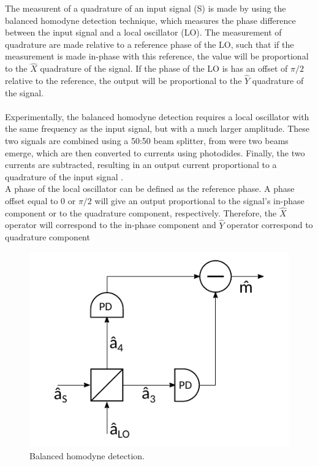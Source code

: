 The measurent of a quadrature of an input signal (S) is made by using the balanced homodyne detection technique, which measures the phase difference between the input signal and a local oscillator (LO). The measurement of quadrature are made relative to a reference phase of the LO, such that if the measurement is made in-phase with this reference, the value will be proportional to the $\hat{X}$ quadrature of the signal. If the phase of the LO is has an offset of $\pi/2$ relative to the reference, the output will be proportional to the $\hat{Y}$ quadrature of the signal.\\
\\
Experimentally, the balanced homodyne detection requires a local oscillator with the same frequency as the input signal, but with a much larger amplitude. These two signals are combined using a 50:50 beam splitter, from were two beams emerge, which are then converted to currents using photodides. Finally, the two currents are subtracted, resulting in an output current proportional to a quadrature of the input signal
\cite{fox2006}.\\
%
A phase of the local oscillator can be defined as the reference phase. A phase offset equal to $0$ or $\pi/2$ will give an output proportional to the signal's in-phase component or to the quadrature component, respectively. Therefore, the $\hat{X}$ operator will correspond to the in-phase component and $\hat{Y}$ operator correspond to quadrature component
\\
%
\begin{figure}[H]
	\label{fig:scheme_homodyne}
	\centering
	\includegraphics{./sdf/quantum_noise/figures/scheme_homodyne.pdf}
	\caption{Balanced homodyne detection.}
\end{figure}
